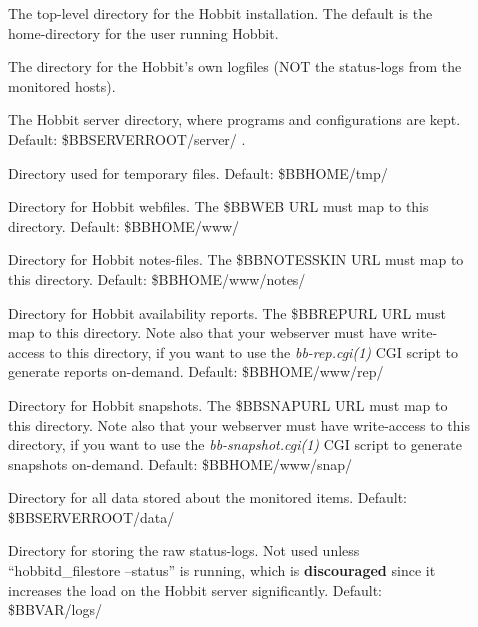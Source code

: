 \begin{description}

\item[] The top-level directory for the Hobbit
  installation. The default is the home-directory for the user running
  Hobbit. 


 

\item[] The directory for the Hobbit's own logfiles (NOT
  the status-logs from the monitored hosts). 


 

\item[] The Hobbit server directory, where programs and
  configurations are kept. Default: \$BBSERVERROOT/server/ . 


\item[] Directory used for temporary files. Default: \$BBHOME/tmp/ 

 
\item[] Directory for Hobbit webfiles. The \$BBWEB URL must map
  to this directory. Default: \$BBHOME/www/ 


\item[] Directory for Hobbit notes-files. The \$BBNOTESSKIN URL
  must map to this directory. Default: \$BBHOME/www/notes/ 



\item[] Directory for Hobbit availability reports. The \$BBREPURL
  URL must map to this directory. Note also that your webserver must
  have write-access to this directory, if you want to use the
  \emph{bb-rep.cgi(1)} CGI script to generate reports
  on-demand. Default: \$BBHOME/www/rep/ 


 

\item[] Directory for Hobbit snapshots. The \$BBSNAPURL URL must
  map to this directory. Note also that your webserver must have
  write-access to this directory, if you want to use the
  \emph{bb-snapshot.cgi(1)} CGI script to generate snapshots
  on-demand. Default: \$BBHOME/www/snap/ 


 

\item[] Directory for all data stored about the monitored items. Default: \$BBSERVERROOT/data/ 

 

\item[] Directory for storing the raw status-logs. Not used
  unless ``hobbitd\_filestore --status'' is running, which is
  \textbf{discouraged} since it increases the load on the Hobbit
  server significantly. Default: \$BBVAR/logs/ 



\end{description}
